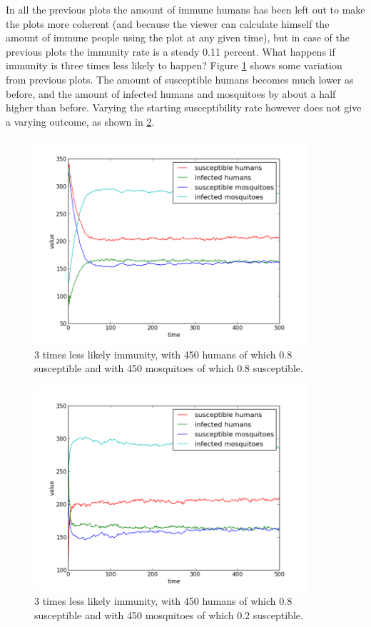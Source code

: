 \documentclass[a4paper]{report}
\begin{document}
In all the previous plots the amount of immune humans has been left out to make
the plots more coherent (and because the viewer can calculate himself the amount
of immune people using the plot at any given time), but in case of the previous
plots the immunity rate is a steady 0.11
percent. What happens if immunity is three times less likely to happen? Figure
\ref{fig:less_immunity_05_08_05_08} shows some variation from previous plots.
The amount of susceptible humans becomes much lower as before, and the amount of
infected humans and mosquitoes by about a half higher than before. Varying the
starting susceptibility rate however does not give a varying outcome, as shown
in \ref{fig:less_immunity_05_08_05_02}.


\begin{figure}[htbp]
    \centering
    \includegraphics[width=0.9\textwidth]{less_immunity_05_08_05_08.png}
    \caption{3 times less likely immunity, with 450 humans of which 0.8
        susceptible and with 450 mosquitoes of which 0.8 susceptible.
    }
    \label{fig:less_immunity_05_08_05_08}
\end{figure}

\begin{figure}[htbp]
    \centering
    \includegraphics[width=0.9\textwidth]{less_immunity_05_08_05_02.png}
    \caption{3 times less likely immunity, with 450 humans of which 0.8
        susceptible and with 450 mosquitoes of which 0.2 susceptible.
    }
    \label{fig:less_immunity_05_08_05_02}
\end{figure}
\end{document}
